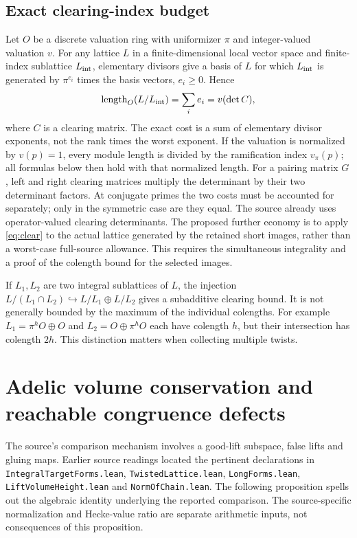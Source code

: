 \documentclass[11pt,a4paper]{article}
\begin{document}
\subsection{Exact clearing-index budget}
Let $O$ be a discrete valuation ring with uniformizer $\pi$ and integer-valued valuation $v$. For any lattice $L$ in a finite-dimensional local vector space and finite-index sublattice $L_{\rm int}$, elementary divisors give a basis of $L$ for which $L_{\rm int}$ is generated by $\pi^{e_i}$ times the basis vectors, $e_i\geq0$. Hence
\begin{equation}\label{eq:clear}
\operatorname{length}_O(L/L_{\rm int})=\sum_i e_i=v(\det C),
\end{equation}
where $C$ is a clearing matrix. The exact cost is a sum of elementary divisor exponents, not the rank times the worst exponent. If the valuation is normalized by $v(p)=1$, every module length is divided by the ramification index $v_\pi(p)$; all formulas below then hold with that normalized length. For a pairing matrix $G$, left and right clearing matrices multiply the determinant by their two determinant factors. At conjugate primes the two costs must be accounted for separately; only in the symmetric case are they equal. The source already uses operator-valued clearing determinants. The proposed further economy is to apply \eqref{eq:clear} to the actual lattice generated by the retained short images, rather than a worst-case full-source allowance. This requires the simultaneous integrality and a proof of the colength bound for the selected images.

If $L_1,L_2$ are two integral sublattices of $L$, the injection $L/(L_1\cap L_2)\hookrightarrow L/L_1\oplus L/L_2$ gives a subadditive clearing bound. It is not generally bounded by the maximum of the individual colengths. For example $L_1=\pi^hO\oplus O$ and $L_2=O\oplus\pi^hO$ each have colength $h$, but their intersection has colength $2h$. This distinction matters when collecting multiple twists.

\section{Adelic volume conservation and reachable congruence defects}\label{sec:reachable}
The source's comparison mechanism involves a good-lift subspace, false lifts and gluing maps. Earlier source readings located the pertinent declarations in \texttt{IntegralTargetForms.lean}, \texttt{TwistedLattice.lean}, \texttt{LongForms.lean}, \texttt{LiftVolumeHeight.lean} and \texttt{NormOfChain.lean}. The following proposition spells out the algebraic identity underlying the reported comparison. The source-specific normalization and Hecke-value ratio are separate arithmetic inputs, not consequences of this proposition.
\end{document}
